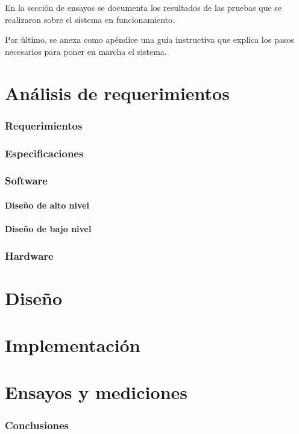 En la sección de ensayos se documenta los resultados de las pruebas que se realizaron sobre el sistema en funcionamiento.

Por último, se anexa como apéndice una guía instructiva que explica los pasos necesarios para poner en marcha el sistema.

\part{Análisis de requerimientos}\label{part:analisis}
\section{Requerimientos}
\section{Especificaciones}
\section{Software}
\subsection{Diseño de alto nivel}
\subsection{Diseño de bajo nivel}
\section{Hardware}

\clearpage
\part{Diseño}\label{part:diseno}
\clearpage
\part{Implementación}\label{part:impl}
\clearpage
\part{Ensayos y mediciones}\label{part:ensayos}
\section{Conclusiones}